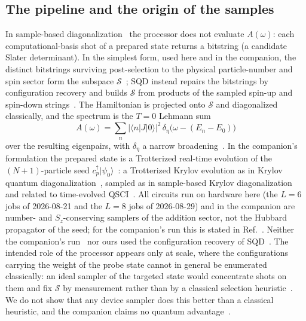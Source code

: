 \documentclass[submission, PhysCore]{SciPost}
\begin{document}
\subsection{The pipeline and the origin of the samples}
In sample-based diagonalization~\cite{SQDchem2025,QSCI2023,SKQD2501} the processor does not evaluate $A(\omega)$: each computational-basis shot of a prepared state returns a bitstring (a candidate Slater determinant). In the simplest form, used here and in the companion, the distinct bitstrings surviving post-selection to the physical particle-number and spin sector form the subspace $\mathcal{S}$~\cite{QSCI2023}; SQD instead repairs the bitstrings by configuration recovery and builds $\mathcal S$ from products of the sampled spin-up and spin-down strings~\cite{SQDchem2025}. The Hamiltonian is projected onto $\mathcal{S}$ and diagonalized classically, and the spectrum is the $T=0$ Lehmann sum
\begin{equation}
A(\omega)=\sum_n|\langle n|J|0\rangle|^2\,\delta_\eta\big(\omega-(E_n-E_0)\big)
\label{eq:lehmann}
\end{equation}
over the resulting eigenpairs, with $\delta_\eta$ a narrow broadening~\cite{Lehmann1954}. In the companion's formulation the prepared state is a Trotterized real-time evolution of the $(N{+}1)$-particle seed $c^{\dagger}_p|\psi_0\rangle$~\cite{SQDspec2608}: a Trotterized Krylov evolution as in Krylov quantum diagonalization~\cite{Yoshioka2025}, sampled as in sample-based Krylov diagonalization~\cite{SKQD2501} and related to time-evolved QSCI~\cite{Mikkelsen2024}. All circuits run on hardware here (the $L=6$ jobs of 2026-08-21 and the $L=8$ jobs of 2026-08-29) and in the companion are number- and $S_z$-conserving samplers of the addition sector, not the Hubbard propagator of the seed; for the companion's run this is stated in Ref.~\cite{SQDspec2608}. Neither the companion's run~\cite{SQDspec2608} nor ours used the configuration recovery of SQD~\cite{SQDchem2025}. The intended role of the processor appears only at scale, where the configurations carrying the weight of the probe state cannot in general be enumerated classically: an ideal sampler of the targeted state would concentrate shots on them and fix $\mathcal{S}$ by measurement rather than by a classical selection heuristic~\cite{SQDchem2025}. We do not show that any device sampler does this better than a classical heuristic, and the companion claims no quantum advantage~\cite{SQDspec2608}.
\end{document}
